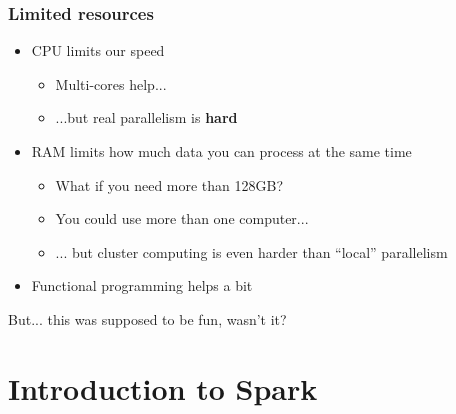 \documentclass{beamer}
\begin{document}
\begin{frame}
  \frametitle{Limited resources}
  \begin{itemize}
  \item CPU limits our speed
    \begin{itemize}
    \item Multi-cores help...
    \item ...but real parallelism is \textbf{hard}
    \end{itemize}
  \item RAM limits how much data you can process at the same time
    \begin{itemize}
    \item What if you need more than 128GB?
    \item You could use more than one computer...
    \item ... but cluster computing is even harder than ``local'' parallelism
    \end{itemize}
  \item Functional programming helps a bit
  \end{itemize}
\end{frame}
\begin{frame}[plain]
  \center
  \huge But... this was supposed to be fun, wasn't it?
\end{frame}

\section{Introduction to Spark}
\end{document}
